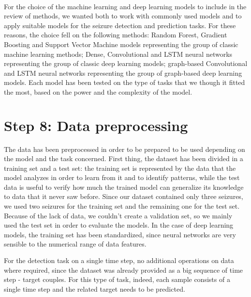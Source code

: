 \paragraph{} For the choice of the machine learning and deep learning models to include in the review of methods, we wanted both to work with commonly used models and to apply suitable models for the seizure detection and prediction tasks. For these reasons, the choice fell on the following methods: Random Forest, Gradient Boosting and Support Vector Machine models representing the group of classic machine learning methods; Dense, Convolutional and LSTM neural networks representing the group of classic deep learning models; graph-based Convolutional and LSTM neural networks representing the group of graph-based deep learning models. Each model has been tested on the type of tasks that we though it fitted the most, based on the power and the complexity of the model.


\section{Step 8: Data preprocessing} \label{sec: step_data_preprocessing}
\paragraph{} The data has been preprocessed in order to be prepared to be used depending on the model and the task concerned. First thing, the dataset has been divided in a training set and a test set: the training set is represented by the data that the model analyzes in order to learn from it and to identify patterns, while the test data is useful to verify how much the trained model can generalize its knowledge to data that it never saw before. Since our dataset contained only three seizures, we used two seizures for the training set and the remaining one for the test set. Because of the lack of data, we couldn't create a validation set, so we mainly used the test set in order to evaluate the models. In the case of deep learning models, the training set has been standardized, since neural networks are very sensible to the numerical range of data features.

For the detection task on a single time step, no additional operations on data where required, since the dataset was already provided as a big sequence of time step - target couples. For this type of task, indeed, each sample consists of a single time step and the related target needs to be predicted.

